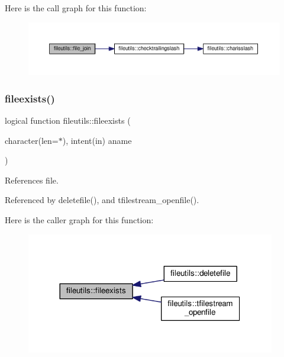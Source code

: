 Here is the call graph for this function\+:
\nopagebreak
\begin{figure}[H]
\begin{center}
\leavevmode
\includegraphics[width=350pt]{namespacefileutils_abc59cd6627541557f05e51e8571b77d6_cgraph}
\end{center}
\end{figure}
\mbox{\label{namespacefileutils_a7eed5e57dbe4803901c5cb2d33f32e66}} 
\subsubsection{\texorpdfstring{fileexists()}{fileexists()}}
{\footnotesize\ttfamily logical function fileutils\+::fileexists (\begin{DoxyParamCaption}\item[{character(len=$\ast$), intent(in)}]{aname }\end{DoxyParamCaption})\hspace{0.3cm}{\ttfamily [private]}}



References file.



Referenced by deletefile(), and tfilestream\+\_\+openfile().

Here is the caller graph for this function\+:
\nopagebreak
\begin{figure}[H]
\begin{center}
\leavevmode
\includegraphics[width=308pt]{namespacefileutils_a7eed5e57dbe4803901c5cb2d33f32e66_icgraph}
\end{center}
\end{figure}
\mbox{\label{namespacefileutils_a7e3025ea32fc9f426d78cd5dab68e470}} 
